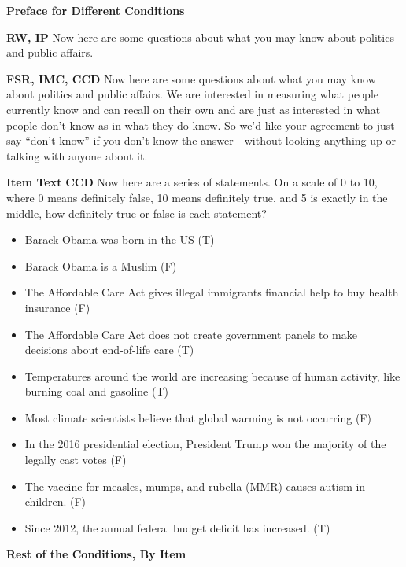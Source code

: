 \noindent
\textbf{Preface for Different Conditions}

\textbf{RW, IP}\newline
Now here are some questions about what you may know about politics and public affairs.

\textbf{FSR, IMC, CCD}\newline
Now here are some questions about what you may know about politics and public affairs.
We are interested in measuring what people currently know and can recall on their own and are just as interested in what people don't know as in what they do know. So we'd like your agreement to just say ``don't know'' if you don't know the answer—without looking anything up or talking with anyone about it.

\textbf{Item Text}
\textbf{CCD}\newline
Now here are a series of statements. On a scale of 0 to 10, where 0 means definitely false, 10 means definitely true, and 5 is exactly in the middle, how definitely true or false is each statement?

\begin{itemize}
	\item Barack Obama was born in the US (T)
	\item  Barack Obama is a Muslim (F)
	\item  The Affordable Care Act gives illegal immigrants financial help to buy health insurance (F)
	\item  The Affordable Care Act does not create government panels to make decisions about end-of-life care (T)
	\item  Temperatures around the world are increasing because of human activity, like burning coal and gasoline (T)
	\item  Most climate scientists believe that global warming is not occurring (F)
	\item  In the 2016 presidential election, President Trump won the majority of the legally cast votes (F)
	\item  The vaccine for measles, mumps, and rubella (MMR) causes autism in children. (F)
	\item  Since 2012, the annual federal budget deficit has increased. (T)
\end{itemize}

\textbf{Rest of the Conditions, By Item}

